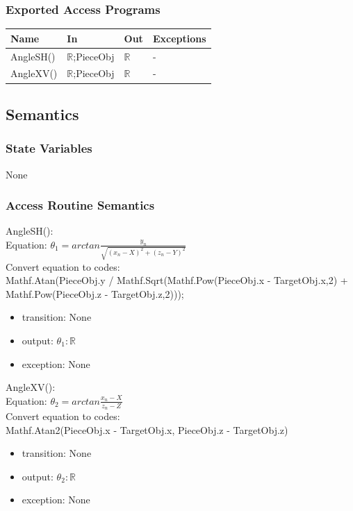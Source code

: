 \documentclass[12pt, titlepage]{article}
\begin{document}
\subsubsection{Exported Access Programs}

\begin{center}
	\begin{tabular}{p{2cm} p{4cm} p{4cm} p{2cm}}
		\hline
		\textbf{Name} & \textbf{In} & \textbf{Out} & \textbf{Exceptions} \\
		\hline
		AngleSH() & $\mathbb{R}$;PieceObj & $\mathbb{R}$ & - \\
		AngleXV() & $\mathbb{R}$;PieceObj & $\mathbb{R}$ & - \\
		\hline
	\end{tabular}
\end{center}

\subsection{Semantics}

\subsubsection{State Variables}

None

\subsubsection{Access Routine Semantics}

\noindent AngleSH():\\
Equation: $\theta_{1}=arctan \frac{y_{n}}{\sqrt{(x_{n}-X)^2+(z_{n}-Y)^2}}$\\
Convert equation to codes:\\
Mathf.Atan(PieceObj.y / Mathf.Sqrt(Mathf.Pow(PieceObj.x - TargetObj.x,2) + Mathf.Pow(PieceObj.z - TargetObj.z,2)));
\begin{itemize}
	\item transition: None   
	\item output: $\theta_{1}: \mathbb{R}$
	\item exception: None
\end{itemize}

\noindent AngleXV():\\
Equation: $\theta_{2}=arctan \frac{x_{n}-X}{z_{n}-Z}$\\
Convert equation to codes:\\
Mathf.Atan2(PieceObj.x - TargetObj.x, PieceObj.z - TargetObj.z)
\begin{itemize}
	\item transition: None  
	\item output: $\theta_{2}: \mathbb{R}$
	\item exception: None
\end{itemize}
\end{document}
